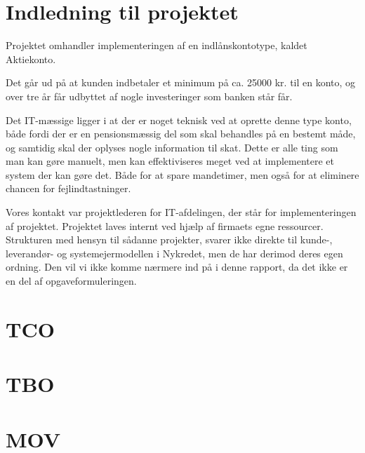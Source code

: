 \documentclass[12pt,a4paper,oneside]{article}
\begin{document}
\section{Indledning til projektet}
Projektet omhandler implementeringen af en indlånskontotype, kaldet Aktiekonto.

Det går ud på at kunden indbetaler et minimum på ca. 25000 kr. til en konto, og
over tre år får udbyttet af nogle investeringer som banken står får.

Det IT-mæssige ligger i at der er noget teknisk ved at oprette denne type konto,
både fordi der er en pensionsmæssig del som skal behandles på en bestemt måde, og
samtidig skal der oplyses nogle information til skat. Dette er alle ting som man
kan gøre manuelt, men kan effektiviseres meget ved at implementere et system der
kan gøre det. Både for at spare mandetimer, men også for at eliminere chancen
for fejlindtastninger.

Vores kontakt var projektlederen for IT-afdelingen, der står for
implementeringen af projektet. Projektet laves internt ved hjælp af firmaets
egne ressourcer. Strukturen med hensyn til sådanne projekter, svarer
ikke direkte til kunde-, leverandør- og systemejermodellen i Nykredet, men de
har derimod deres egen ordning. Den vil vi ikke komme nærmere ind på i denne
rapport, da det ikke er en del af opgaveformuleringen.

\section{TCO}


\section{TBO}


\section{MOV}

\end{document}
